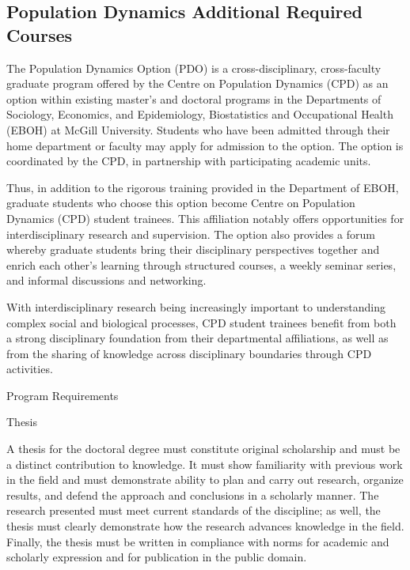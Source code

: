 \documentclass[
]{book}
\begin{document}
\hypertarget{population-dynamics-additional-required-courses}{%
\subsection{Population Dynamics Additional Required Courses}\label{population-dynamics-additional-required-courses}}

The Population Dynamics Option (PDO) is a cross-disciplinary, cross-faculty graduate program offered by the Centre on Population Dynamics (CPD) as an option within existing master's and doctoral programs in the Departments of Sociology, Economics, and Epidemiology, Biostatistics and Occupational Health (EBOH) at McGill University. Students who have been admitted through their home department or faculty may apply for admission to the option. The option is coordinated by the CPD, in partnership with participating academic units.

Thus, in addition to the rigorous training provided in the Department of EBOH, graduate students who choose this option become Centre on Population Dynamics (CPD) student trainees. This affiliation notably offers opportunities for interdisciplinary research and supervision. The option also provides a forum whereby graduate students bring their disciplinary perspectives together and enrich each other's learning through structured courses, a weekly seminar series, and informal discussions and networking.

With interdisciplinary research being increasingly important to understanding complex social and biological processes, CPD student trainees benefit from both a strong disciplinary foundation from their departmental affiliations, as well as from the sharing of knowledge across disciplinary boundaries through CPD activities.

Program Requirements

Thesis

A thesis for the doctoral degree must constitute original scholarship and must be a distinct contribution to knowledge. It must show familiarity with previous work in the field and must demonstrate ability to plan and carry out research, organize results, and defend the approach and conclusions in a scholarly manner. The research presented must meet current standards of the discipline; as well, the thesis must clearly demonstrate how the research advances knowledge in the field. Finally, the thesis must be written in compliance with norms for academic and scholarly expression and for publication in the public domain.
\end{document}
